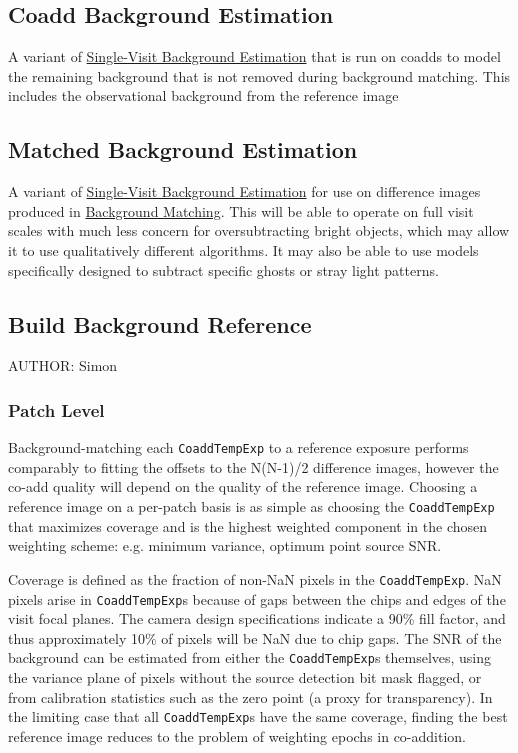 \subsection{Coadd Background Estimation}
\label{sec:acCoaddBackgroundEstimation}

A variant of \hyperref[sec:acSingleVisitBackgroundEstimation]{Single-Visit Background Estimation} that is run on coadds to model the remaining background that is not removed during background matching.  This includes the observational background from the reference image

\subsection{Matched Background Estimation}
\label{sec:acMatchedBackgroundEstimation}

A variant of \hyperref[sec:acSingleVisitBackgroundEstimation]{Single-Visit Background Estimation} for use on difference images produced in \hyperref[sec:drpBackgroundMatchAndReject]{Background Matching}.  This will be able to operate on full visit scales with much less concern for oversubtracting bright objects, which may allow it to use qualitatively different algorithms.  It may also be able to use models specifically designed to subtract specific ghosts or stray light patterns.

\subsection{Build Background Reference}
\label{sec:acBuildBackgroundReference}
AUTHOR: Simon
\subsubsection{Patch Level}
Background-matching each \texttt{CoaddTempExp} to a reference exposure performs comparably to fitting
the offsets to the N(N-1)/2 difference images, however the co-add quality will depend on the quality of the
reference image.  Choosing a reference image on a per-patch basis is as simple as choosing the \texttt{CoaddTempExp} that
maximizes coverage and is the highest weighted component in the chosen weighting scheme: e.g. minimum variance, optimum point source SNR. 

Coverage is defined as the fraction of non-NaN
pixels in the \texttt{CoaddTempExp}. NaN pixels arise in \texttt{CoaddTempExp}s because of gaps between the chips and edges of the visit focal
planes.  The camera design specifications indicate a 90\% fill factor, and thus approximately 10\% of pixels
will be NaN due to chip gaps.  The SNR of the background can be estimated from either the \texttt{CoaddTempExp}s themselves,
using the variance plane of pixels without the source detection bit mask flagged, or from calibration
statistics such as the zero point (a proxy for transparency).  In the limiting case that all \texttt{CoaddTempExp}s have the
same coverage, finding the best reference image reduces to the problem of weighting epochs in co-addition.

